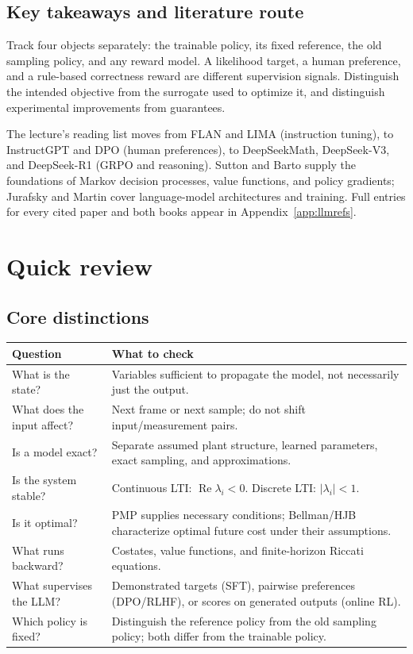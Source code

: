 \documentclass[11pt,a4paper]{article}
\numberwithin{equation}{section}
\numberwithin{figure}{section}
\numberwithin{table}{section}
\begin{document}
\subsection{Key takeaways and literature route}\label{sec:llmtakeaways}
Track four objects separately: the trainable policy, its fixed reference, the old sampling policy, and any reward model. A likelihood target, a human preference, and a rule-based correctness reward are different supervision signals. Distinguish the intended objective from the surrogate used to optimize it, and distinguish experimental improvements from guarantees.

The lecture's reading list moves from FLAN and LIMA (instruction tuning), to InstructGPT and DPO (human preferences), to DeepSeekMath, DeepSeek-V3, and DeepSeek-R1 (GRPO and reasoning). Sutton and Barto supply the foundations of Markov decision processes, value functions, and policy gradients; Jurafsky and Martin cover language-model architectures and training. Full entries for every cited paper and both books appear in Appendix~\ref{app:llmrefs}.

\clearpage
\section{Quick review}
\begingroup\small
\subsection{Core distinctions}
\begin{center}\small
\begin{tabularx}{\textwidth}{@{}P{39mm}Y@{}}\toprule
Question & What to check\\\midrule
What is the state? & Variables sufficient to propagate the model, not necessarily just the output.\\\addlinespace
What does the input affect? & Next frame or next sample; do not shift input/measurement pairs.\\\addlinespace
Is a model exact? & Separate assumed plant structure, learned parameters, exact sampling, and approximations.\\\addlinespace
Is the system stable? & Continuous LTI: $\operatorname{Re}\lambda_i<0$. Discrete LTI: $|\lambda_i|<1$.\\\addlinespace
Is it optimal? & PMP supplies necessary conditions; Bellman/HJB characterize optimal future cost under their assumptions.\\\addlinespace
What runs backward? & Costates, value functions, and finite-horizon Riccati equations.\\\addlinespace
What supervises the LLM? & Demonstrated targets (SFT), pairwise preferences (DPO/RLHF), or scores on generated outputs (online RL).\\\addlinespace
Which policy is fixed? & Distinguish the reference policy from the old sampling policy; both differ from the trainable policy.\\\bottomrule
\end{tabularx}\end{center}
\end{document}
